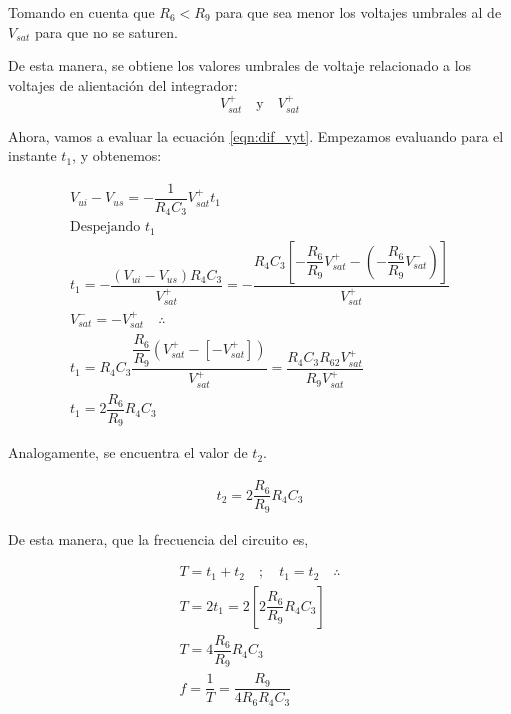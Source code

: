 \begin{enumerate}
                Tomando en cuenta que $R_6<R_9$ para que sea menor los voltajes umbrales al de $V_{sat}$ para que no se saturen.

                De esta manera, se obtiene los valores umbrales de voltaje relacionado a los voltajes de alientación del integrador: $$V_{sat}^+ \quad \text{y} \quad V_{sat}^+$$

                Ahora, vamos a evaluar la ecuación \ref{eqn:dif_vyt}. Empezamos evaluando para el instante $t_1$, y obtenemos:

                \begin{gather}
                    V_{ui}-V_{us}=-\dfrac{1}{R_4C_3}V_{sat}^+t_1 \nonumber \\[0.5cm]
                    \text{Despejando $t_1$} \nonumber \\[0.5cm]
                    t_1=-\dfrac{(V_{ui}-V_{us})R_4C_3}{V_{sat}^+}=-\dfrac{R_4C_3\left[-\dfrac{R_6}{R_9}V_{sat}^+-\left(-\dfrac{R_6}{R_9}V_{sat}^-\right)\right]}{V_{sat}^+} \nonumber \\[0.5cm]
                    V_{sat}^-=-V_{sat}^+ \quad \therefore \nonumber \\[0.5cm]
                    t_1=R_4C_3\dfrac{\dfrac{R_6}{R_9}(V_{sat}^+-[-V_{sat}^+])}{V_{sat}^+}=\dfrac{R_4C_3R_62V_{sat}^+}{R_9V_{sat}^+} \nonumber \\[0.5cm]
                    t_1=2\dfrac{R_6}{R_9}R_4C_3 \label{eqn:t1_parte3}
                \end{gather}

                Analogamente, se encuentra el valor de $t_2$.

                \begin{gather}
                    t_2=2\dfrac{R_6}{R_9}R_4C_3 \label{eqn:t2_parte3}
                \end{gather}

                De esta manera, que la frecuencia del circuito es,

                \begin{gather}
                    T=t_1+t_2 \quad ; \quad t_1=t_2  \quad \therefore \nonumber \\[0.5cm]
                    T=2t_1=2\left[2\dfrac{R_6}{R_9}R_4C_3 \right] \nonumber \\[0.5cm]
                    T=4\dfrac{R_6}{R_9}R_4C_3 \label{eqn:T_parte3} \\[0.5cm]
                    f=\dfrac{1}{T}=\dfrac{R_9}{4R_6R_4C_3} \label{eqn:f_parte3}
                \end{gather}


\end{enumerate}
